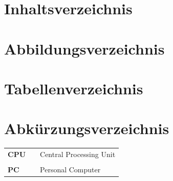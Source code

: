 \documentclass[12pt]{article}
\begin{document}
\section*{Inhaltsverzeichnis}
\makeatletter
{}
\makeatother
\markright{ } %


\cleardoublepage

\section*{Abbildungsverzeichnis}
\makeatletter
{}
\makeatother
\markright{ } %
\cleardoublepage

\section*{Tabellenverzeichnis}
\makeatletter
{}
\makeatother
\markright{ } %
\cleardoublepage

\section*{Abkürzungsverzeichnis}
\makeatletter
{}
\makeatother
\markright{ } %
	\vspace{1cm}
	\begin{tabular}{lcl}
		\textbf{CPU} & & Central Processing Unit\\
		&&\\
		\textbf{PC} & & Personal Computer\\
	\end{tabular}
\cleardoublepage
\end{document}

